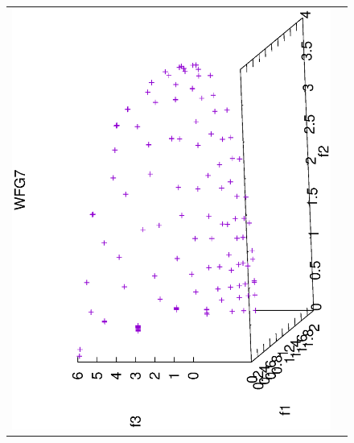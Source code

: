 \begin{figure}[H]
\begin{tabular}{cc}
  \includegraphics[scale=0.3, angle=-90,origin=c]{Figures_Chapter7/Results_Chapter4/Summary_Representative/VSD-MOEA-D/WFG7.eps} \\

\end{tabular}
\end{figure}
